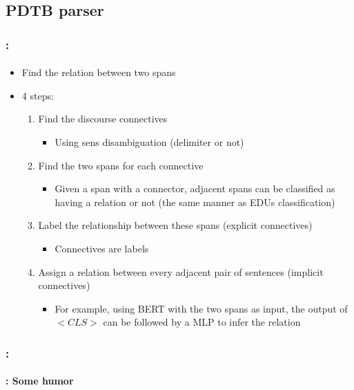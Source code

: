 \documentclass[xcolor=table]{beamer}
\begin{document}
\subsection{PDTB parser}

\begin{frame}
	\frametitle{\insertshortsubtitle: \insertsection}
	\framesubtitle{\insertsubsection}
	
	\begin{itemize}
		\item Find the relation between two spans
		\item 4 steps: 
		\begin{enumerate}
			\item Find the discourse connectives
			\begin{itemize}
				\item Using sens disambiguation (delimiter or not)
			\end{itemize}
			\item Find the two spans for each connective
			\begin{itemize}
				\item Given a span with a connector, adjacent spans can be classified as having a relation or not (the same manner as EDUs classification)
			\end{itemize}
			\item Label the relationship between these spans (explicit connectives)
			\begin{itemize}
				\item Connectives are labels
			\end{itemize}
			\item Assign a relation between every adjacent pair of sentences (implicit connectives)
			\begin{itemize}
				\item For example, using BERT with the two spans as input, the output of $ <CLS> $ can be followed by a MLP to infer the relation
			\end{itemize}
		\end{enumerate}
	\end{itemize}
	
\end{frame}

\begin{frame}
	\frametitle{\insertshortsubtitle: \insertsection}
	\framesubtitle{\insertsubsection: Some humor}
	
	\begin{center}
	\end{center}
	
\end{frame}
\end{document}
